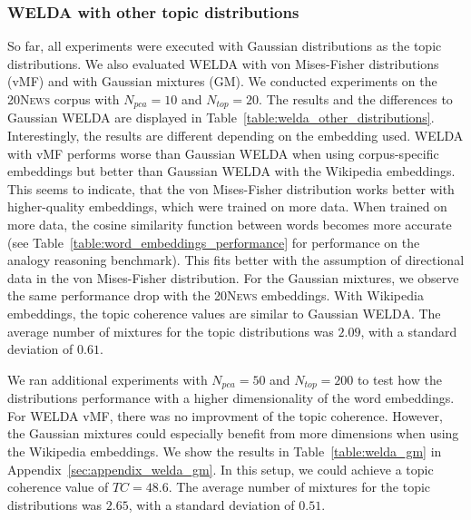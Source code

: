 \documentclass[
        a4paper,
        titlepage,
        twoside,
        parskip,
        numbers=noenddot
        ]{scrbook}
\theoremstyle{break}
\begin{document}
\subsubsection{WELDA with other topic distributions}

So far, all experiments were executed with Gaussian distributions as the topic distributions.
We also evaluated WELDA with von Mises-Fisher distributions (vMF) and with Gaussian mixtures (GM).
We conducted experiments on the \textsc{20News} corpus with $N_{pca} = 10$ and $N_{top} = 20$.
The results and the differences to Gaussian WELDA are displayed in Table~\ref{table:welda_other_distributions}.
Interestingly, the results are different depending on the embedding used.
WELDA with vMF performs worse than Gaussian WELDA when using corpus-specific embeddings but better than Gaussian WELDA with the Wikipedia embeddings.
This seems to indicate, that the von Mises-Fisher distribution works better with higher-quality embeddings, which were trained on more data.
When trained on more data, the cosine similarity function between words becomes more accurate (see Table~\ref{table:word_embeddings_performance} for performance on the analogy reasoning benchmark).
This fits better with the assumption of directional data in the von Mises-Fisher distribution.
For the Gaussian mixtures, we observe the same performance drop with the \textsc{20News} embeddings.
With Wikipedia embeddings, the topic coherence values are similar to Gaussian WELDA.
The average number of mixtures for the topic distributions was $2.09$, with a standard deviation of $0.61$.

We ran additional experiments with $N_{pca} = 50$ and $N_{top} = 200$ to test how the distributions performance with a higher dimensionality of the word embeddings.
For WELDA vMF, there was no improvment of the topic coherence.
However, the Gaussian mixtures could especially benefit from more dimensions when using the Wikipedia embeddings.
We show the results in Table~\ref{table:welda_gm} in Appendix~\ref{sec:appendix_welda_gm}.
In this setup, we could achieve a topic coherence value of $TC = 48.6$.
The average number of mixtures for the topic distributions was $2.65$, with a standard deviation of $0.51$.

\end{document}
